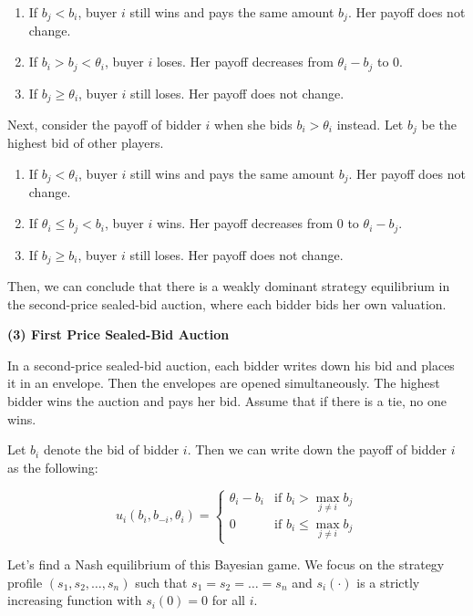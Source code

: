 \documentclass[12pt, oneside]{article}
\begin{document}
\begin{enumerate}
    \item If \( b_j < b_i \), buyer \( i \) still wins and pays the same amount \( b_j \). Her payoff does not change.
    \item If \( b_i > b_j < \theta_i \), buyer \( i \) loses. Her payoff decreases from \( \theta_i - b_j \) to \( 0 \).
    \item If \( b_j \geq \theta_i \), buyer \( i \) still loses. Her payoff does not change.
\end{enumerate}

Next, consider the payoff of bidder \( i \) when she bids \( b_i > \theta_i \) instead. Let \( b_j \) be the highest bid of other players.

\begin{enumerate}
    \item If \( b_j < \theta_i \), buyer \( i \) still wins and pays the same amount \( b_j \). Her payoff does not change.
    \item If \( \theta_i \leq b_j < b_i \), buyer \( i \) wins. Her payoff decreases from \( 0 \) to \( \theta_i - b_j \).
    \item If \( b_j \geq b_i \), buyer \( i \) still loses. Her payoff does not change.
\end{enumerate}

Then, we can conclude that there is a weakly dominant strategy equilibrium in the second-price sealed-bid auction, where each bidder bids her own valuation.

\textbf{(3) First Price Sealed-Bid Auction}

In a second-price sealed-bid auction, each bidder writes down his bid and places it in an envelope. Then the envelopes are opened simultaneously. The highest bidder wins the auction and pays her bid. Assume that if there is a tie, no one wins.

Let \( b_i \) denote the bid of bidder \( i \). Then we can write down the payoff of bidder \( i \) as the following:

\[
u_i(b_i, b_{-i}, \theta_i) =
\begin{cases}
\theta_i - b_i & \text{if } b_i > \max_{j \neq i} b_j \\
0 & \text{if } b_i \leq \max_{j \neq i} b_j
\end{cases}
\]

Let’s find a Nash equilibrium of this Bayesian game. We focus on the strategy profile \( (s_1, s_2, \dots, s_n) \) such that \( s_1 = s_2 = \dots = s_n \) and \( s_i(\cdot) \) is a strictly increasing function with \( s_i(0) = 0 \) for all \( i \).
\end{document}
